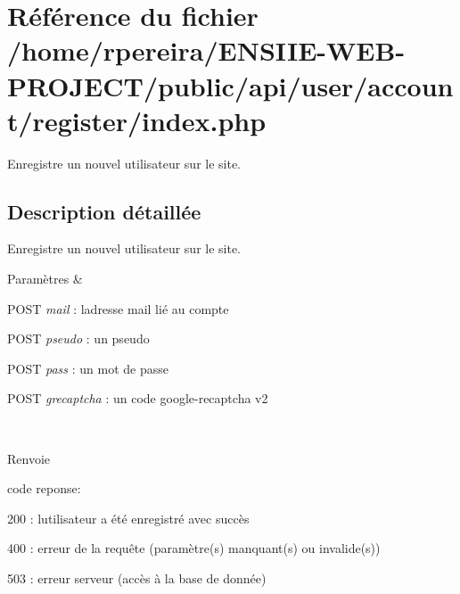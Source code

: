 \hypertarget{user_2account_2register_2index_8php}{}\section{Référence du fichier /home/rpereira/\+E\+N\+S\+I\+I\+E-\/\+W\+E\+B-\/\+P\+R\+O\+J\+E\+C\+T/public/api/user/account/register/index.php}
\label{user_2account_2register_2index_8php}


Enregistre un nouvel utilisateur sur le site.  




\subsection{Description détaillée}
Enregistre un nouvel utilisateur sur le site. 


\begin{DoxyParams}{Paramètres}
{\em } & 
\begin{DoxyItemize}
\item P\+O\+ST {\itshape mail} \+: l\textquotesingle{}adresse mail lié au compte
\item P\+O\+ST {\itshape pseudo} \+: un pseudo
\item P\+O\+ST {\itshape pass} \+: un mot de passe
\item P\+O\+ST {\itshape grecaptcha} \+: un code google-\/recaptcha v2 
\end{DoxyItemize}\\
\hline
\end{DoxyParams}
\begin{DoxyReturn}{Renvoie}

\begin{DoxyItemize}
\item code reponse\+:
\begin{DoxyItemize}
\item 200 \+: l\textquotesingle{}utilisateur a été enregistré avec succès
\item 400 \+: erreur de la requête (paramètre(s) manquant(s) ou invalide(s))
\item 503 \+: erreur serveur (accès à la base de donnée) 
\end{DoxyItemize}
\end{DoxyItemize}
\end{DoxyReturn}
